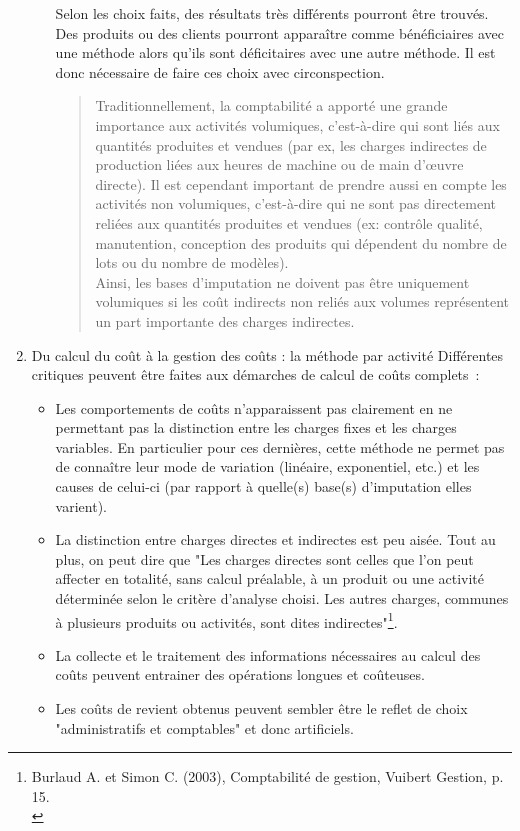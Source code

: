 \documentclass{tufte-handout}
\begin{document}
\begin{enumerate}
\begin{enumerate}
Selon les choix faits, des résultats très différents pourront être trouvés. Des produits ou des clients pourront apparaître comme bénéficiaires avec une méthode alors qu'ils sont déficitaires avec une autre méthode. Il est donc nécessaire de faire ces choix avec circonspection.\\

\begin{quote}
Traditionnellement, la comptabilité a apporté une grande importance aux activités volumiques, c'est-à-dire qui sont liés aux quantités produites et vendues (par ex, les charges indirectes de production liées aux heures de machine ou de main d’œuvre directe). Il est cependant important de prendre aussi en compte les activités non volumiques, c'est-à-dire qui ne sont pas directement reliées aux quantités produites et vendues (ex: contrôle qualité, manutention, conception des produits qui dépendent du nombre de lots ou du nombre de modèles).\\
Ainsi, les bases d’imputation ne doivent pas être uniquement volumiques si les coût indirects non reliés aux volumes représentent un part importante des charges indirectes.\\
\end{quote}
\end{enumerate}

\item Du calcul du coût à la gestion des coûts : la méthode par activité
\label{sec:orgfe68800}
Différentes critiques peuvent être faites aux démarches de calcul de coûts complets :\\
\begin{itemize}
\item Les comportements de coûts n'apparaissent pas clairement en ne permettant pas la distinction entre les charges fixes et les charges variables. En particulier pour ces dernières, cette méthode ne permet pas de connaître leur mode de variation (linéaire, exponentiel, etc.) et les causes de celui-ci (par rapport à quelle(s) base(s) d'imputation elles varient).\\
\item La distinction entre charges directes et indirectes est peu aisée. Tout au plus, on peut dire que "Les charges directes sont celles que l'on peut affecter en totalité, sans calcul préalable, à un produit ou une activité déterminée selon le critère d'analyse choisi. Les autres charges, communes à plusieurs produits ou activités, sont dites indirectes"\footnote{Burlaud A. et Simon C. (2003), Comptabilité de gestion, Vuibert Gestion, p. 15.\\}.\\
\item La collecte et le traitement des informations nécessaires au calcul des coûts peuvent entrainer des opérations longues et coûteuses.\\
\item Les coûts de revient obtenus peuvent sembler être le reflet de choix "administratifs et comptables" et donc artificiels.\\
\end{itemize}


\end{enumerate}
\end{document}
